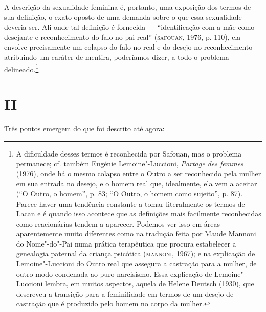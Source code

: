 A descrição da sexualidade feminina é, portanto, uma exposição dos
termos de sua definição, o exato oposto de uma demanda sobre o que essa
sexualidade deveria ser. Ali onde tal definição é fornecida ---
``identificação com a mãe como desejante e reconhecimento do falo no pai
real'' (\textsc{safouan}, 1976, p. 110), ela envolve precisamente um colapso do
falo no real e do desejo no reconhecimento --- atribuindo um caráter de
mentira, poderíamos dizer, a todo o problema delineado.\footnote{A
  dificuldade desses termos é reconhecida por Safouan, mas o problema
  permanece; cf. também Eugénie Lemoine"-Luccioni, \emph{Partage des
  femmes} (1976), onde há o mesmo colapso entre o Outro a ser
  reconhecido pela mulher em sua entrada no desejo, e o homem real que,
  idealmente, ela vem a aceitar (``O Outro, o homem'', p. 83; ``O Outro,
  o homem como sujeito'', p. 87). Parece haver uma tendência constante a
  tomar literalmente os termos de Lacan e é quando isso acontece que as
  definições mais facilmente reconhecidas como reacionárias tendem a
  aparecer. Podemos ver isso em áreas aparentemente muito diferentes
  como na tradução feita por Maude Mannoni do Nome"-do"-Pai numa prática
  terapêutica que procura estabelecer a genealogia paternal da criança
  psicótica (\textsc{mannoni}, 1967); e na explicação de Lemoine"-Luccioni do
  Outro real que assegura a castração para a mulher, de outro modo
  condenada ao puro narcisismo. Essa explicação de Lemoine"-Luccioni
  lembra, em muitos aspectos, aquela de Helene Deutsch (1930), que
  descreveu a transição para a feminilidade em termos de um desejo de
  castração que é produzido pelo homem no corpo da mulher.}

\pagebreak

\section{II}

Três pontos emergem do que foi descrito até agora:

